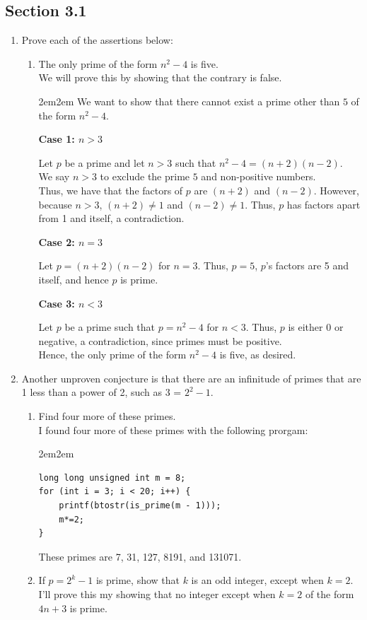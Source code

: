 \documentclass[10pt,oneside]{book}
\newcommand{\gspc}{\vspace{0.13cm}} %
\newcommand{\gline}{\gspc\\} %
\newcommand{\centerit}[1]{{\begin{center} #1 \end{center}}}
\let\endoldproof\endproof
\renewenvironment{proof}[1][\proofname]
  {\vspace{0.2cm}\begin{adjustwidth}{2em}{2em}
   \oldproof[#1]}
  {\endoldproof
\end{adjustwidth}}
\begin{document}
\subsection*{Section 3.1}
\begin{enumerate}
	\item [3.] Prove each of the assertions below:
	\begin{enumerate}
		\item [(e)] The only prime of the form $n^2 -4$ is five. \gline
		We will prove this by showing that the contrary is false. 
		\begin{proof}
			We want to show that there cannot exist a prime other than $5$ of the form $n^2 -4$.
			\centerit{\textbf{Case 1: $n > 3$}}
			Let $p$ be a prime and let $n>3$ such that $n^2-4 = (n+2)(n-2)$.\\
			\footnotesize *We say $n>3$ to exclude the prime $5$ and non-positive numbers.\normalsize\gline
			Thus, we have that the factors of $p$ are $(n+2)$ and $(n-2)$. However, because $n >3$, $(n+2)\ne 1$ and $(n-2)\ne 1$. Thus, $p$ has factors apart from 1 and itself, a contradiction.
			\centerit{\textbf{Case 2: $n = 3$}}
			Let $p = (n+2)(n-2)$ for $n = 3$. Thus, $p=5$, $p$'s factors are 5 and itself, and hence $p$ is prime.
			\centerit{\textbf{Case 3: $n < 3$}}
			Let $p$ be a prime such that $p = n^2-4$ for $n < 3$. Thus, $p$ is either 0 or negative, a contradiction, since primes must be positive.\gline
			Hence, the only prime of the form $n^2 -4$ is five, as desired. 
		\end{proof}
	\end{enumerate}
	\item [11.] Another unproven conjecture is that there are an infinitude of primes that are 1 less than a power of 2, such as 3 = $2^2 - 1$.
	\begin{enumerate}
		\item Find four more of these primes.\gline
		I found four more of these primes with the following prorgam:
\begin{adjustwidth}{2em}{2em}
\begin{verbatim}
long long unsigned int m = 8;
for (int i = 3; i < 20; i++) {
	printf(btostr(is_prime(m - 1)));
	m*=2;
}
\end{verbatim}
\end{adjustwidth}
		These primes are 7, 31, 127, 8191, and 131071.
		\item If $p = 2^k - 1$ is prime, show that $k$ is an odd integer, except when $k = 2$.\gline
		I'll prove this my showing that no integer except when $k=2$ of the form $4n +3$ is prime. 

\end{enumerate}
\end{enumerate}
\end{document}
